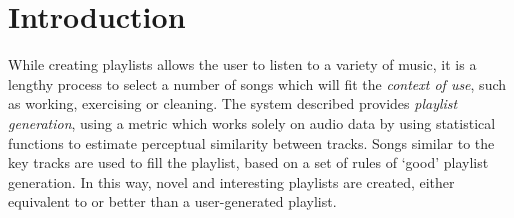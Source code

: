 \section{Introduction}
While creating playlists allows the user to listen to a variety of music, it is a lengthy process to select a number of songs which will fit the \emph{context of use}, such as working, exercising or cleaning. The system described provides \emph{playlist generation}, using a metric which works solely on audio data by using statistical functions to estimate perceptual similarity between tracks. Songs similar to the key tracks are used to fill the playlist, based on a set of rules of `good' playlist generation. In this way, novel and interesting playlists are created, either equivalent to or better than a user-generated playlist.
